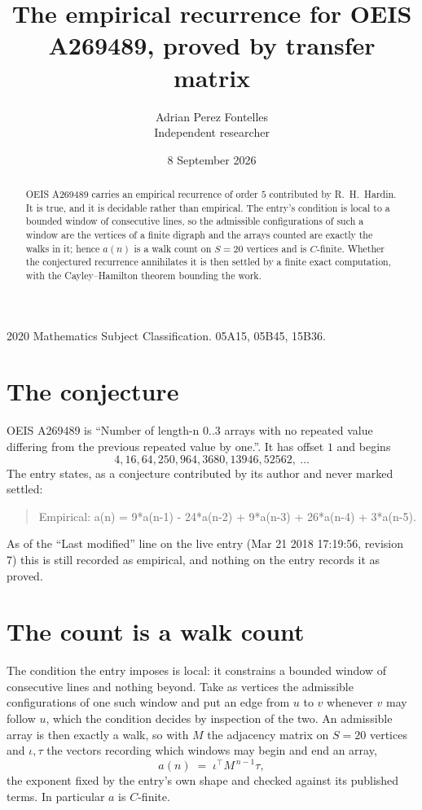 \documentclass[11pt,a4paper]{article}
\title{The empirical recurrence for OEIS A269489, proved by transfer matrix}
\author{Adrian Perez Fontelles\\ \small Independent researcher}
\date{8 September 2026}
\theoremstyle{plain}
\theoremstyle{definition}
\begin{document}
\maketitle

\begin{abstract}
OEIS A269489 carries an empirical recurrence of order $5$ contributed by R.~H.~Hardin. It is
true, and it is decidable rather than empirical. The entry's condition is local to a bounded window of consecutive lines, so
the admissible configurations of such a window are the vertices of a finite digraph and the
arrays counted are exactly the walks in it; hence $a(n)$ is a walk count on $S=20$ vertices
and is $C$-finite. Whether the conjectured recurrence annihilates it is then settled by a
finite exact computation, with the Cayley--Hamilton theorem bounding the work.
\end{abstract}

\noindent\small 2020 Mathematics Subject Classification. 05A15, 05B45, 15B36.\normalsize

\section{The conjecture}

OEIS A269489 is ``Number of length-n 0..3 arrays with no repeated value differing from the previous repeated value by one.''. It has offset $1$ and begins
\[
4, 16, 64, 250, 964, 3680, 13946, 52562,\ \dots
\]
The entry states, as a conjecture contributed by its author and never marked settled:
\begin{quote}
Empirical: a(n) = 9*a(n-1) - 24*a(n-2) + 9*a(n-3) + 26*a(n-4) + 3*a(n-5).
\end{quote}
As of the ``Last modified'' line on the live entry (Mar 21 2018 17:19:56, revision 7) this is still
recorded as empirical, and nothing on the entry records it as proved.

\section{The count is a walk count}

The condition the entry imposes is local: it constrains a bounded window of consecutive lines and nothing beyond. Take as
vertices the admissible configurations of one such window and put an edge from $u$ to $v$
whenever $v$ may follow $u$, which the condition decides by inspection of the two. An
admissible array is then exactly a walk, so with $M$ the adjacency matrix on $S=20$ vertices
and $\iota,\tau$ the vectors recording which windows may begin and end an array,
\[
a(n)\;=\;\iota^{\!\top}M^{\,n-1}\tau ,
\]
the exponent fixed by the entry's own shape and checked against its published terms. In
particular $a$ is $C$-finite.
\end{document}
